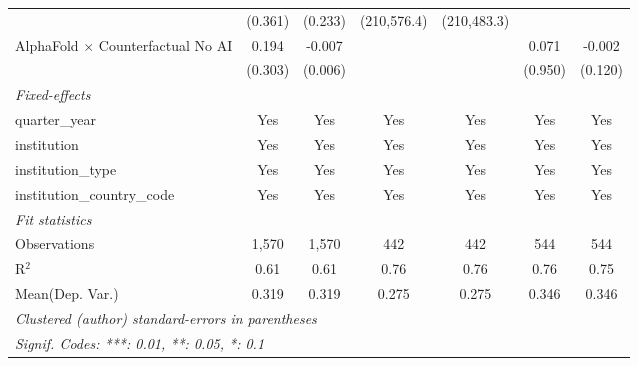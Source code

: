 \begin{tabular}{lcccccc}
                                            & (0.361) & (0.233)       & (210,576.4) & (210,483.3) &         &   \\   
   AlphaFold $\times$ Counterfactual No AI  & 0.194   & -0.007        &             &             & 0.071   & -0.002\\   
                                            & (0.303) & (0.006)       &             &             & (0.950) & (0.120)\\   
   \midrule
   \emph{Fixed-effects}\\
   quarter\_year                            & Yes     & Yes           & Yes         & Yes         & Yes     & Yes\\  
   institution                              & Yes     & Yes           & Yes         & Yes         & Yes     & Yes\\  
   institution\_type                        & Yes     & Yes           & Yes         & Yes         & Yes     & Yes\\  
   institution\_country\_code               & Yes     & Yes           & Yes         & Yes         & Yes     & Yes\\  
   \midrule
   \emph{Fit statistics}\\
   Observations                             & 1,570   & 1,570         & 442         & 442         & 544     & 544\\  
   R$^2$                                    & 0.61    & 0.61          & 0.76        & 0.76        & 0.76    & 0.75\\  
Mean(Dep. Var.) & 0.319 & 0.319 & 0.275 & 0.275 & 0.346 & 0.346 \\
   \midrule \midrule
   \multicolumn{7}{l}{\emph{Clustered (author) standard-errors in parentheses}}\\
   \multicolumn{7}{l}{\emph{Signif. Codes: ***: 0.01, **: 0.05, *: 0.1}}\\
\end{tabular}
\par\endgroup
